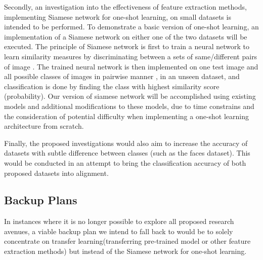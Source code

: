 \documentclass{article}
\begin{document}
Secondly, an investigation into the effectiveness of feature extraction methods, implementing Siamese network for one-shot learning, on small datasets is intended to be performed. To demonstrate a basic version of one-shot learning, an implementation of a Siamese network \cite{bromley1994signature} on either one of the two datasets will be executed. The principle of Siamese network is first to train a neural network to learn similarity measures by discriminating between a sets of same/different pairs of image \cite{koch2015}. The trained neural network is then implemented on one test image and all possible classes of images in pairwise manner , in an unseen dataset, and classification is done by finding the class with highest similarity score (probability).   Our version of siamese network will be accomplished using existing models and additional modifications to these models, due to time constrains and the consideration of potential difficulty when implementing a one-shot learning architecture from scratch.

Finally, the proposed investigations would also aim to increase the accuracy of datasets with subtle difference between classes (such as the faces dataset). This would be conducted in an attempt to bring the classification accuracy of both proposed datasets into alignment.

\subsection{Backup Plans}
\label{sec:plans}

In instances where it is no longer possible to explore all proposed research avenues, a viable backup plan we intend to fall back to would be to solely concentrate on transfer learning(transferring pre-trained model or other feature extraction methods) but instead of the Siamese network for one-shot learning. 



\end{document}
